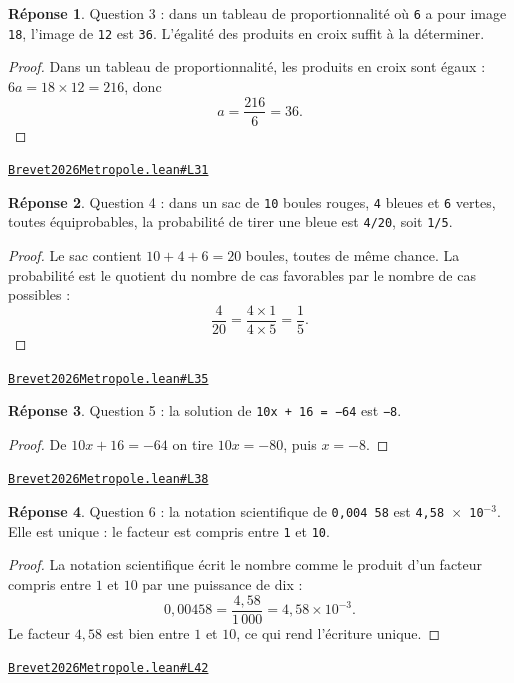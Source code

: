 \documentclass[11pt,a4paper]{article}
\theoremstyle{definition}
\theoremstyle{plain}
\theoremstyle{definition}
\newtheorem*{reponse}{Réponse}
\newcommand{\source}[2]{\par\smallskip\noindent\hfill{\footnotesize\href{#1}{\texttt{#2}}}\par\smallskip}
\begin{document}
\begin{reponse}
Question 3 : dans un tableau de proportionnalité où \texttt{6} a pour image \texttt{18},
l'image de \texttt{12} est \texttt{36}. L'égalité des produits en croix suffit à la déterminer.
\end{reponse}
\begin{proof}
Dans un tableau de proportionnalité, les produits en croix sont égaux : $6a = 18 \times 12
= 216$, donc
\[ a = \frac{216}{6} = 36 . \]
\end{proof}
\source{https://github.com/Commutator-IO/learn-lean/blob/main/exams/2026/Brevet2026Metropole.lean\#L31}{Brevet2026Metropole.lean\#L31}

\begin{reponse}
Question 4 : dans un sac de \texttt{10} boules rouges, \texttt{4} bleues et \texttt{6} vertes,
toutes équiprobables, la probabilité de tirer une bleue est \texttt{4/20}, soit \texttt{1/5}.
\end{reponse}
\begin{proof}
Le sac contient $10 + 4 + 6 = 20$ boules, toutes de même chance. La probabilité est le
quotient du nombre de cas favorables par le nombre de cas possibles :
\[ \frac{4}{20} = \frac{4 \times 1}{4 \times 5} = \frac{1}{5} . \]
\end{proof}
\source{https://github.com/Commutator-IO/learn-lean/blob/main/exams/2026/Brevet2026Metropole.lean\#L35}{Brevet2026Metropole.lean\#L35}

\begin{reponse}
Question 5 : la solution de \texttt{10x + 16 = −64} est \texttt{−8}.
\end{reponse}
\begin{proof}
De $10x + 16 = -64$ on tire $10x = -80$, puis $x = -8$.
\end{proof}
\source{https://github.com/Commutator-IO/learn-lean/blob/main/exams/2026/Brevet2026Metropole.lean\#L38}{Brevet2026Metropole.lean\#L38}

\begin{reponse}
Question 6 : la notation scientifique de \texttt{0,004 58} est \texttt{4,58 \(\times\) 10\(^{-3}\)}. Elle
est unique : le facteur est compris entre \texttt{1} et \texttt{10}.
\end{reponse}
\begin{proof}
La notation scientifique écrit le nombre comme le produit d'un facteur compris entre $1$
et $10$ par une puissance de dix :
\[ 0{,}00458 = \frac{4{,}58}{1\,000} = 4{,}58 \times 10^{-3} . \]
Le facteur $4{,}58$ est bien entre $1$ et $10$, ce qui rend l'écriture unique.
\end{proof}
\source{https://github.com/Commutator-IO/learn-lean/blob/main/exams/2026/Brevet2026Metropole.lean\#L42}{Brevet2026Metropole.lean\#L42}
\end{document}
